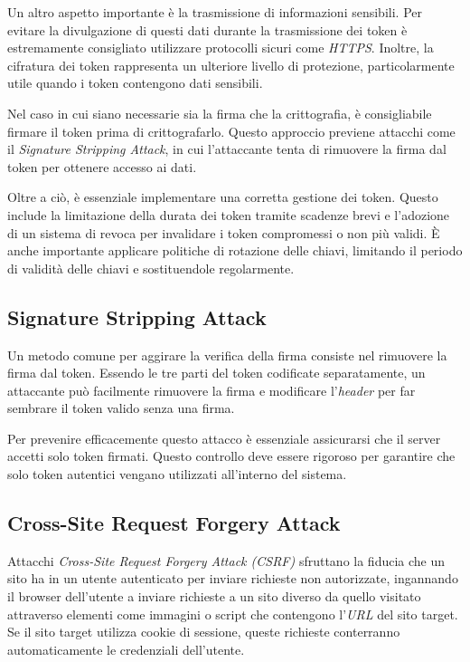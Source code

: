 Un altro aspetto importante è la trasmissione di informazioni sensibili.
Per evitare la divulgazione di questi dati durante la trasmissione dei token è estremamente consigliato utilizzare protocolli sicuri come \emph{HTTPS}.
Inoltre, la cifratura dei token rappresenta un ulteriore livello di protezione, particolarmente utile quando i token contengono dati sensibili.

Nel caso in cui siano necessarie sia la firma che la crittografia, è consigliabile firmare il token prima di crittografarlo.
Questo approccio previene attacchi come il \emph{Signature Stripping Attack}, in cui l'attaccante tenta di rimuovere la firma dal token per ottenere accesso ai dati.

Oltre a ciò, è essenziale implementare una corretta gestione dei token. Questo include la limitazione della durata dei token tramite scadenze brevi e l'adozione di un sistema di revoca per invalidare i token compromessi o non più validi. È anche importante applicare politiche di rotazione delle chiavi, limitando il periodo di validità delle chiavi e sostituendole regolarmente.

\subsection{Signature Stripping Attack}
Un metodo comune per aggirare la verifica della firma consiste nel rimuovere la firma dal token.
Essendo le tre parti del token codificate separatamente, un attaccante può facilmente rimuovere la firma e modificare l'\emph{header} per far sembrare il token valido senza una firma.

Per prevenire efficacemente questo attacco è essenziale assicurarsi che il server accetti solo token firmati. Questo controllo deve essere rigoroso per garantire che solo token autentici vengano utilizzati all'interno del sistema.

\subsection{Cross-Site Request Forgery Attack}
Attacchi \emph{Cross-Site Request Forgery Attack (CSRF)} sfruttano la fiducia che un sito ha in un utente autenticato per inviare richieste non autorizzate, ingannando il browser dell'utente a inviare richieste a un sito diverso da quello visitato attraverso elementi come immagini o script che contengono l'\emph{URL} del sito target.
Se il sito target utilizza cookie di sessione, queste richieste conterranno automaticamente le credenziali dell'utente.

